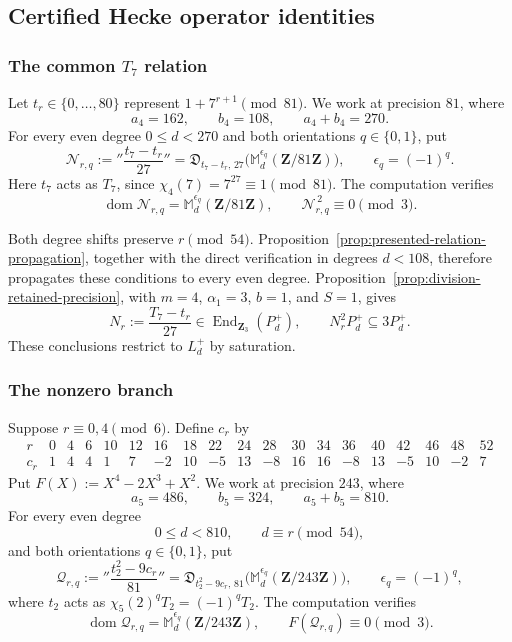 \documentclass[11pt]{article}
\newcommand{\End}{\operatorname{End}}
\theoremstyle{plain}
\theoremstyle{definition}
\theoremstyle{remark}
\numberwithin{equation}{section}
\begin{document}
\subsection{Certified Hecke operator identities}

\subsubsection{The common \(T_7\) relation}

Let \(t_r\in\{0,\ldots,80\}\) represent \(1+7^{r+1}\pmod{81}\). We work at precision \(81\), where \[ a_4=162,\qquad b_4=108,\qquad a_4+b_4=270. \] For every even degree \(0\leq d<270\) and both orientations \(q\in\{0,1\}\), put \[ \mathcal N_{r,q}:= ''\frac{t_7-t_r}{27}'' = \mathfrak D_{t_7-t_r,\,27} \bigl(\mathbb M_d^{\epsilon_q}(\mathbf Z/81\mathbf Z)\bigr), \qquad \epsilon_q=(-1)^q. \] Here \(t_7\) acts as \(T_7\), since \(\chi_4(7)=7^{27}\equiv1\pmod{81}\). The computation \cite[\href{https://github.com/nrustom/hecke-congruences/blob/main/playground_mod_81.ipynb}{\nolinkurl{playground_mod_81.ipynb}}] {RustomHeckeCongruences} verifies \[ \operatorname{dom}\mathcal N_{r,q} =\mathbb M_d^{\epsilon_q}(\mathbf Z/81\mathbf Z), \qquad \mathcal N_{r,q}^{\,2}\equiv0\pmod3. \]

Both degree shifts preserve \(r\pmod{54}\). Proposition~\ref{prop:presented-relation-propagation}, together with the direct verification in degrees \(d<108\), therefore propagates these conditions to every even degree. Proposition~\ref{prop:division-retained-precision}, with \(m=4\), \(\alpha_1=3\), \(b=1\), and \(S=1\), gives \[ N_r:=\frac{T_7-t_r}{27}\in\End_{\mathbf Z_3}(P_d^+), \qquad N_r^2P_d^+\subseteq3P_d^+. \] These conclusions restrict to \(L_d^+\) by saturation.

\subsubsection{The nonzero branch}

Suppose \(r\equiv0,4\pmod6\). Define \(c_r\) by \begin{equation}
\begin{array}{c|rrrrrrrrrrrrrrrrrr}
r
&0&4&6&10&12&16&18&22&24&28&30&34&36&40&42&46&48&52\\
\hline
c_r
&1&4&4&1&7&-2&10&-5&13&-8&16&16&-8&13&-5&10&-2&7
\end{array}
\label{eq:p3-nonzero-constants}
\end{equation}
Put \(F(X):=X^4-2X^3+X^2\). We work at precision \(243\), where \[ a_5=486,\qquad b_5=324,\qquad a_5+b_5=810. \] For every even degree \[ 0\leq d<810,\qquad d\equiv r\pmod{54}, \] and both orientations \(q\in\{0,1\}\), put \[ \mathcal Q_{r,q}:= ''\frac{t_2^2-9c_r}{81}'' = \mathfrak D_{t_2^2-9c_r,\,81} \bigl(\mathbb M_d^{\epsilon_q}(\mathbf Z/243\mathbf Z)\bigr), \qquad \epsilon_q=(-1)^q, \] where \(t_2\) acts as \(\chi_5(2)^qT_2=(-1)^qT_2\). The computation \cite[\href{https://github.com/nrustom/hecke-congruences/blob/main/playground_mod_81.ipynb}{\nolinkurl{playground_mod_81.ipynb}}]{RustomHeckeCongruences} verifies \[ \operatorname{dom}\mathcal Q_{r,q} =\mathbb M_d^{\epsilon_q}(\mathbf Z/243\mathbf Z), \qquad F(\mathcal Q_{r,q})\equiv0\pmod3. \]
\end{document}
